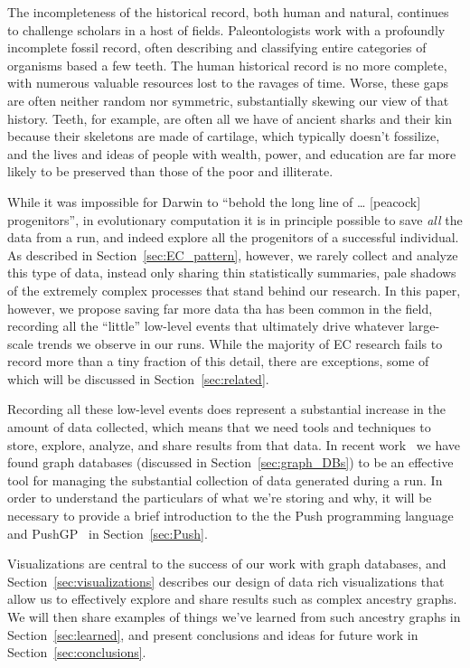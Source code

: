 The incompleteness of the historical record, both human and natural, continues
to challenge scholars in a host of fields. Paleontologists work with a 
profoundly
incomplete fossil record, often describing and classifying entire categories of
organisms based a few teeth. The human historical record is no more complete,
with numerous valuable resources lost to the ravages of time. Worse, these 
gaps are often neither random nor symmetric, substantially skewing our view 
of that history. Teeth, for example, are often all we have of ancient 
sharks and their kin because their skeletons are made of cartilage, which
typically doesn't fossilize, and the lives and ideas of people with wealth, 
power, and education are far more likely to be preserved than those of the
poor and illiterate.

While it was impossible for Darwin to ``behold the long line of \ldots 
[peacock] progenitors'', in evolutionary computation it is in principle possible
to save \emph{all} the data from a run, and indeed explore all the progenitors
of a successful individual. As described in Section~\ref{sec:EC_pattern},
however, we rarely collect and analyze this type of data, instead only sharing
thin statistically summaries, pale shadows of the extremely complex 
processes that stand behind our research. 
In this paper, however, we propose
saving far more data tha has been common in the field, recording all the ``little'' low-level events that ultimately drive whatever large-scale trends 
we observe in our runs. While the majority of EC research fails to record more
than a tiny fraction of this detail, there are exceptions, some of which 
will be discussed in Section~\ref{sec:related}.

Recording all these low-level events does represent a substantial increase 
in the amount of data
collected, which means that we need tools and techniques to store, explore,
analyze, and share results from that data. In recent work~\cite{graph_db_work}
we have found graph databases (discussed in
Section~\ref{sec:graph_DBs}) to be an effective tool for managing the 
substantial collection of data generated during a run. In order to understand
the particulars of what we're storing and why, it will be necessary to provide
a brief introduction to the the Push programming language and
PushGP~\cite{PushGP} in Section~\ref{sec:Push}.

Visualizations are central to the success
of our work with graph databases, and Section~\ref{sec:visualizations}
describes our design of data rich 
visualizations that allow us to effectively explore and share results such as
complex ancestry graphs. We will then share examples of things we've learned
from such ancestry graphs in Section~\ref{sec:learned}, and present conclusions
and ideas for future work in Section~\ref{sec:conclusions}.

